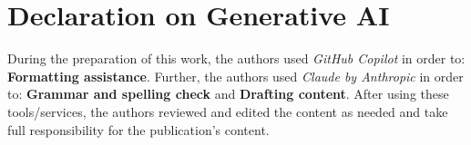 \documentclass{ceurart}
\begin{document}
\section*{Declaration on Generative AI}

  During the preparation of this work, the authors used \emph{GitHub Copilot} in order to: \textbf{Formatting assistance}. Further, the authors used \emph{Claude by Anthropic} in order to: \textbf{Grammar and spelling check} and \textbf{Drafting content}. After using these tools/services, the authors reviewed and edited the content as needed and take full responsibility for the publication's content.


\end{document}
